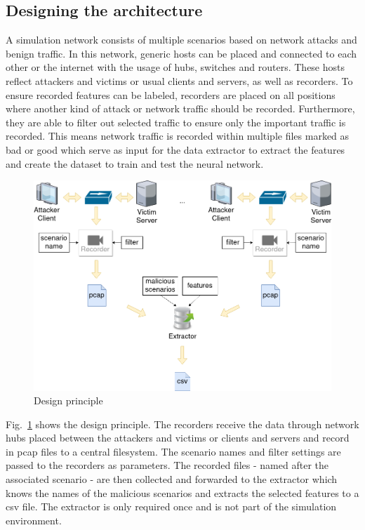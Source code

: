 \documentclass[conference]{IEEEtran}
\begin{document}
\subsection{Designing the architecture}

A simulation network consists of multiple scenarios based on network attacks and benign traffic. In this network, generic hosts can be placed and connected to each other or the internet with the usage of hubs, switches and routers. These hosts reflect attackers and victims or usual clients and servers, as well as recorders. To ensure recorded features can be labeled, recorders are placed on all positions where another kind of attack or network traffic should be recorded. Furthermore, they are able to filter out selected traffic to ensure only the important traffic is recorded. This means network traffic is recorded within multiple files marked as bad or good which serve as input for the data extractor to extract the features and create the dataset to train and test the neural network.

\begin{figure}[htbp]
\centerline{\includegraphics[scale=0.26]{principle.png}}
\caption{Design principle}
\label{principle}
\end{figure}

Fig.~\ref{principle} shows the design principle. The recorders receive the data through network hubs placed between the attackers and victims or clients and servers and record in pcap files to a central filesystem. The scenario names and filter settings are passed to the recorders as parameters. The recorded files - named after the associated scenario - are then collected and forwarded to the extractor which knows the names of the malicious scenarios and extracts the selected features to a csv file. The extractor is only required once and is not part of the simulation environment. 
\end{document}
